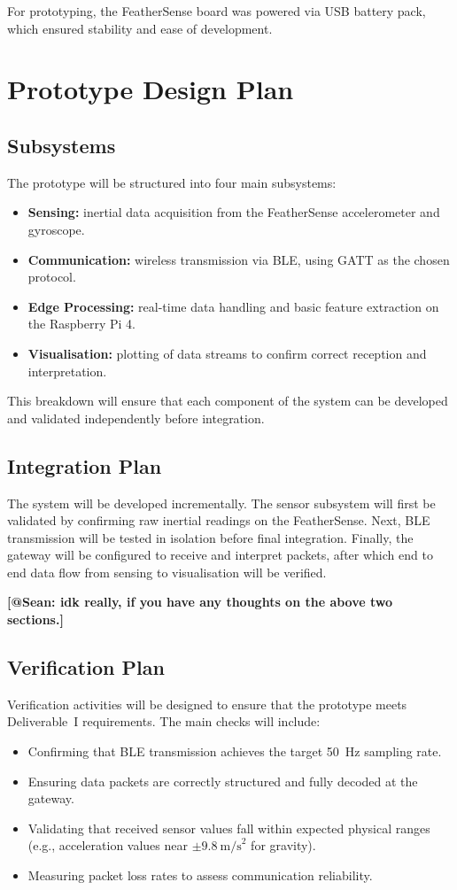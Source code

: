 \documentclass[conference]{IEEEtran}
\begin{document}
For prototyping, the FeatherSense board was powered via USB battery pack, which ensured stability and ease of development.

\section{Prototype Design Plan}

\subsection{Subsystems}
The prototype will be structured into four main subsystems: 
\begin{itemize}
	\item \textbf{Sensing:} inertial data acquisition from the FeatherSense accelerometer and gyroscope. 
	\item \textbf{Communication:} wireless transmission via BLE, using GATT as the chosen protocol. 
	\item \textbf{Edge Processing:} real-time data handling and basic feature extraction on the Raspberry Pi 4. 
	\item \textbf{Visualisation:} plotting of data streams to confirm correct reception and interpretation. 
\end{itemize}
This breakdown will ensure that each component of the system can be developed and validated independently before integration. 

\subsection{Integration Plan}
The system will be developed incrementally. The sensor subsystem will first be validated by confirming raw inertial readings on the FeatherSense. Next, BLE transmission will be tested in isolation before final integration. Finally, the gateway will be configured to receive and interpret packets, after which end to end data flow from sensing to visualisation will be verified. 


\textbf{[@Sean: idk really, if you have any thoughts on the above two sections.]}

\subsection{Verification Plan}
Verification activities will be designed to ensure that the prototype meets Deliverable~I requirements. The main checks will include:
\begin{itemize}
	\item Confirming that BLE transmission achieves the target 50~Hz sampling rate. 
	\item Ensuring data packets are correctly structured and fully decoded at the gateway. 
	\item Validating that received sensor values fall within expected physical ranges (e.g., acceleration values near $\pm 9.8~\text{m/s}^2$ for gravity). 
	\item Measuring packet loss rates to assess communication reliability. 
\end{itemize}
\end{document}
